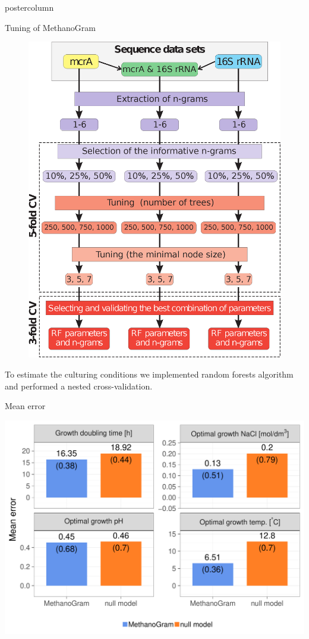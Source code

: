 \documentclass[final]{beamer}\usepackage[]{graphicx}\usepackage[]{color}
\makeatletter
\def\maxwidth{ %
  \ifdim\Gin@nat@width>\linewidth
    \linewidth
  \else
    \Gin@nat@width
  \fi
}
\newenvironment{knitrout}{}{} %
\def\maxwidth{ %
  \ifdim\Gin@nat@width>\linewidth
    \linewidth
  \else
    \Gin@nat@width
  \fi
}
\newenvironment{knitrout}{}{} %
\makeatother
\begin{document}
\begin{frame}
\begin{columns}
\begin{column}{.48\textwidth}
\begin{beamercolorbox}[center,wd=\textwidth]{postercolumn}
\begin{minipage}[T]{.95\textwidth}
{\begin{block}{Tuning of MethanoGram}
\begin{figure}
\includegraphics[width=0.75\columnwidth]{suplem2.eps}
\end{figure}


To estimate the culturing conditions we implemented random forests algorithm and performed a nested cross-validation.

\end{block}


\begin{block}{Mean error}


\begin{knitrout}
\color{fgcolor}

{\centering \includegraphics[width=\maxwidth]{figure/unnamed-chunk-1-1} 

}
\end{knitrout}
\end{block}}
\end{minipage}
\end{beamercolorbox}
\end{column}
\end{columns}
\end{frame}
\end{document}
